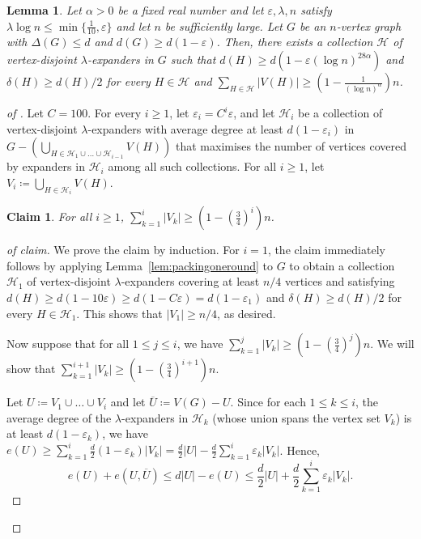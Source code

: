 \documentclass[10pt,a4paper]{amsart}
\newtheorem{lemma}{Lemma}
\newtheorem{claim}{Claim}
\newcommand{\cH}{\mathcal{H}}
\newcommand{\eps}{\varepsilon}
\renewcommand{\setminus}{-}
\begin{document}
\begin{lemma}
	\label{lem:expandercoverweak}
	Let $\alpha > 0$ be a fixed real number and let $\eps, \lambda, n$ satisfy $\lambda \log n \le \min \{\frac{1}{10}, \eps \}$ and let $n$ be sufficiently large. Let $G$ be an $n$-vertex graph with $\Delta(G) \le d$ and $d(G) \ge d(1-\eps)$. Then, there exists a collection $\cH$ of vertex-disjoint $\lambda$-expanders in $G$ such that $d(H) \ge d(1 - \eps (\log n)^{28 \alpha})$ and $\delta(H) \ge d(H)/2$ for every $H \in \cH$ and $\sum_{H \in \cH} |V(H)| \ge (1 - \frac{1}{(\log n)^{\alpha}}) n$. 
\end{lemma}

\begin{proof}[ of ]
	Let $C = 100$. For every $i \ge 1$, let $\eps_i = C^{i} \eps$, and let $\cH_i$ be a collection of vertex-disjoint $\lambda$-expanders with average degree at least $d(1- \eps_i)$ in $G \setminus (\bigcup_{H \in \cH_1 \cup \ldots \cup \cH_{i-1}} V(H))$ that maximises the number of vertices covered by expanders in $\cH_i$ among all such collections. For all $i \ge 1$, let $V_i \coloneqq \bigcup_{H \in \cH_i} V(H)$. 

	\begin{claim}
		\label{claim:coverbyexpanders}
		For all $i \ge 1$, $\sum_{k = 1}^i |V_k| \ge (1 - (\frac{3}{4})^{i})n$.
	\end{claim}
	\begin{proof}[ of claim] 
		We prove the claim by induction. For $i = 1$, the claim immediately follows by applying Lemma~\ref{lem:packingoneround}
		to $G$ to obtain a collection $\cH_1$ of vertex-disjoint $\lambda$-expanders covering at least $n/4$ vertices and satisfying $d(H) \ge d(1 - 10 \eps) \ge d(1 - C \eps) = d (1 - \eps_1)$ and $\delta(H) \ge d(H)/2$ for every $H \in \cH_1$. This shows that $|V_1| \ge n/4$, as desired.

		Now suppose that for all $1 \le j \le i$, we have $\sum_{k = 1}^j |V_k| \ge (1 - (\frac{3}{4})^j)n$. We will show that $\sum_{k = 1}^{i+1} |V_k| \ge (1 - (\frac{3}{4})^{i+1})n$. 

		Let $U \coloneqq V_1 \cup \ldots \cup V_i$ and let $\overline{U} \coloneqq V(G) \setminus U$. Since for each $1 \le k \le i$, the average degree of the $\lambda$-expanders in $\cH_k$ (whose union spans the vertex set $V_k$) is at least $d(1- \eps_k)$, we have $e(U) \ge \sum_{k=1}^i \frac{d}{2} (1- \eps_k) |V_k| = \frac{d}{2} |U| - \frac{d}{2} \sum_{k=1}^i \eps_k|V_k|$. Hence, 
		\begin{equation}
			\label{eq:claim2:1}
			e(U) + e(U, \overline{U}) \le d |U| - e(U) \le \frac{d}{2} |U| + \frac{d}{2} \sum_{k=1}^i \eps_k|V_k|.
		\end{equation}


\end{proof}
\end{proof}
\end{document}
